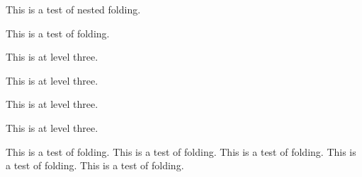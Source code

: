 


{

This is a test of nested folding. 


{{

This is a test of folding. 

{{{
This is at level three.
}}}

{{{
This is at level three.
}}}


{{{
This is at level three.
}}}


{{{
This is at level three.
}}}

}} 

{{This is a test of folding. }} 
{{This is a test of folding. }} 
{{This is a test of folding. }} 
{{This is a test of folding. }} 
{{This is a test of folding. }} 

}